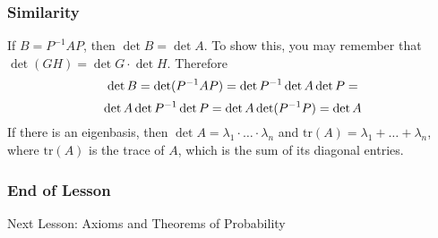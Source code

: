 \documentclass[xcolor=dvipsnames]{beamer}
\begin{document}
\begin{frame}
  \frametitle{Similarity}
  If $B=P^{-1}AP$, then $\det{}B=\det{}A$. To show this, you may
  remember that $\det{}(GH)=\det{}G\cdot\det{}H$. Therefore
  \begin{equation}
    \label{eq:taichahh}
    \det{}B=\det(P^{-1}AP)=\det{}P^{-1}\det{}A\det{}P=\notag
  \end{equation}
  \begin{equation}
    \label{eq:ielaemiy}
    \det{}A\det{}P^{-1}\det{}P=\det{}A\det(P^{-1}P)=\det{}A\notag
  \end{equation}
  If there is an eigenbasis, then
  $\det{}A=\lambda_{1}\cdot\ldots\cdot\lambda_{n}$ and
  $\mbox{tr}(A)=\lambda_{1}+\ldots+\lambda_{n}$, where $\mbox{tr}(A)$ is
  the \alert{trace} of $A$, which is the sum of its diagonal entries.
\end{frame}

\begin{frame}
  \frametitle{End of Lesson}
Next Lesson: Axioms and Theorems of Probability
\end{frame}
\end{document}
